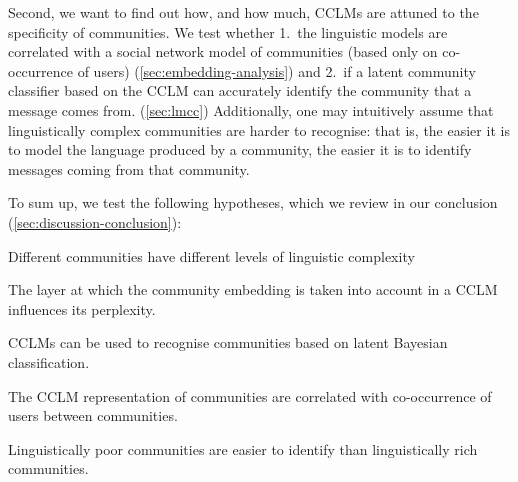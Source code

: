 \documentclass[11pt]{article}
\begin{document}
Second, we want to find out how, and how much, CCLMs are attuned to
the specificity of communities. We test whether 1.\ the linguistic
models are correlated with a social network model of communities (based only on
co-occurrence of users) (\cref{sec:embedding-analysis}) and 2.\ if a latent community
classifier based on the CCLM can accurately identify the community that a
message comes from. (\cref{sec:lmcc}) Additionally, one may
intuitively assume that linguistically complex communities are harder to
recognise: that is, the easier it is to model the language produced by a community,
the easier it is to identify messages coming from that community.

To sum up, we test the following hypotheses, which we review in our
conclusion (\cref{sec:discussion-conclusion}):
\begin{hypotheses}
\item \label{hyp:varying-complexity} Different communities have different levels of linguistic
  complexity
\item \label{hyp:layer-effect} The layer at which the community embedding is taken into account
  in a CCLM influences its perplexity.
\item \label{hyp:LMCC-works} CCLMs can be used to recognise communities based on
  latent Bayesian classification.
\item \label{hyp:extra-linguistic-correlation} The CCLM representation of communities are correlated with
  co-occurrence of users between communities.
\item \label{hyp:rich-harder-to-identify} Linguistically poor communities are easier to identify than
  linguistically rich communities.
\end{hypotheses}

\end{document}
